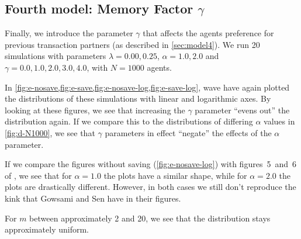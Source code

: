 \documentclass[12pt,a4paper]{article}
\begin{document}
\clearpage
\subsection{Fourth model: Memory Factor $\gamma$}

Finally, we introduce the parameter $\gamma$ that affects the agents preference for previous transaction partners (as described in \cref{sec:model4}). We run 20 simulations with parameters $\lambda = 0.00, 0.25$, $\alpha = 1.0, 2.0$ and $\gamma = 0.0, 1.0, 2.0, 3.0, 4.0$, with $N = 1000$ agents.

In \cref{fig:e-nosave,fig:e-save,fig:e-nosave-log,fig:e-save-log}, wave have again plotted the distributions of these simulations with linear and logarithmic axes.
By looking at these figures, we see that increasing the $\gamma$ parameter ``evens out'' the distribution again. If we compare this to the distributions of differing $\alpha$ values in \cref{fig:d-N1000}, we see that $\gamma$ parameters in effect ``negate'' the effects of the $\alpha$ parameter.

If we compare the figures without saving (\cref{fig:e-nosave-log}) with figures~5~and~6 of \textcite{goswami-sen}, we see that for $\alpha = 1.0$ the plots have a similar shape, while for $\alpha = 2.0$ the plots are drastically different. However, in both cases we still don't reproduce the kink that Gowsami and Sen have in their figures.

For $m$ between approximately 2 and 20, we see that the distribution stays approximately uniform.
\end{document}
